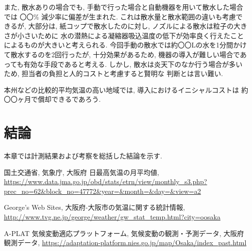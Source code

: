 \documentclass[a4j,fleqn,dvipdfmx,uplatex]{jsarticle}
\begin{document}
また, 散水ありの場合でも, 手動で行った場合と自動機器を用いて散水した場合では
〇〇\% 減少率に偏差が生まれた. これは散水量と散水範囲の違いも考慮できるが, 
大部分は, 紙コップで散水したのに対し, ノズルによる散水は粒子の大きさが小さいために
水の潜熱による凝縮器吸込温度の低下が効率良く行えたことによるものが大きいと考えられる. 
今回手動の散水では約〇〇Lの水を1分間かけて散水するのを2回行ったが, 十分効果があるため, 
機器の導入が難しい場合であっても有効な手段であると考える. 
しかし, 散水は炎天下のなか行う場合が多いため, 担当者の負担と人的コストと考慮すると賢明な
判断とは言い難い. 

本州などの比較的平均気温の高い地域では, 導入におけるイニシャルコストは
約〇〇ヶ月で償却できるであろう. 

\section{結論}
本章では計測結果および考察を総括した結論を示す. 

\begin{thebibliography}{99}
国土交通省, 気象庁, 大阪府 日最高気温の月平均値, 
\url{https://www.data.jma.go.jp/obd/stats/etrn/view/monthly_s3.php?prec_no=62&block_no=47772&year=&month=&day=&view=a2}\vspace{2mm}

George's Web Sites, 大阪府-大阪市の気温に関する統計情報, 
\url{http://www.tvg.ne.jp/george/weather/gw_stat_temp.html?city=oosaka}\vspace{2mm}

A-PLAT 気候変動適応プラットフォーム, 気候変動の観測・予測データ, 大阪府観測データ, 
\url{https://adaptation-platform.nies.go.jp/map/Osaka/index_past.html}\vspace{2mm}
\end{thebibliography}
%
%
%
\end{document}
